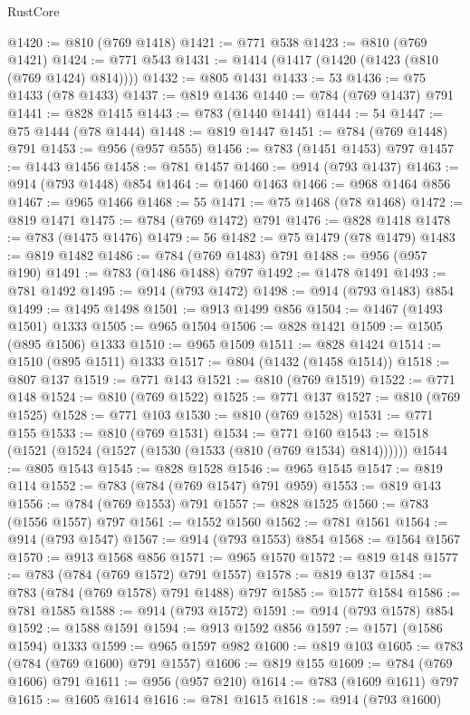 \begin{lexlean}{RustCore}
\begin{coremodule}
@1420 := @810 (@769 @1418)
@1421 := @771 @538
@1423 := @810 (@769 @1421)
@1424 := @771 @543
@1431 := @1414 (@1417 (@1420 (@1423 (@810 (@769 @1424) @814))))
@1432 := @805 @1431
@1433 := 53
@1436 := @75 @1433 (@78 @1433)
@1437 := @819 @1436
@1440 := @784 (@769 @1437) @791
@1441 := @828 @1415
@1443 := @783 (@1440 @1441)
@1444 := 54
@1447 := @75 @1444 (@78 @1444)
@1448 := @819 @1447
@1451 := @784 (@769 @1448) @791
@1453 := @956 (@957 @555)
@1456 := @783 (@1451 @1453) @797
@1457 := @1443 @1456
@1458 := @781 @1457
@1460 := @914 (@793 @1437)
@1463 := @914 (@793 @1448) @854
@1464 := @1460 @1463
@1466 := @968 @1464 @856
@1467 := @965 @1466
@1468 := 55
@1471 := @75 @1468 (@78 @1468)
@1472 := @819 @1471
@1475 := @784 (@769 @1472) @791
@1476 := @828 @1418
@1478 := @783 (@1475 @1476)
@1479 := 56
@1482 := @75 @1479 (@78 @1479)
@1483 := @819 @1482
@1486 := @784 (@769 @1483) @791
@1488 := @956 (@957 @190)
@1491 := @783 (@1486 @1488) @797
@1492 := @1478 @1491
@1493 := @781 @1492
@1495 := @914 (@793 @1472)
@1498 := @914 (@793 @1483) @854
@1499 := @1495 @1498
@1501 := @913 @1499 @856
@1504 := @1467 (@1493 @1501) @1333
@1505 := @965 @1504
@1506 := @828 @1421
@1509 := @1505 (@895 @1506) @1333
@1510 := @965 @1509
@1511 := @828 @1424
@1514 := @1510 (@895 @1511) @1333
@1517 := @804 (@1432 (@1458 @1514))
@1518 := @807 @137
@1519 := @771 @143
@1521 := @810 (@769 @1519)
@1522 := @771 @148
@1524 := @810 (@769 @1522)
@1525 := @771 @137
@1527 := @810 (@769 @1525)
@1528 := @771 @103
@1530 := @810 (@769 @1528)
@1531 := @771 @155
@1533 := @810 (@769 @1531)
@1534 := @771 @160
@1543 := @1518 (@1521 (@1524 (@1527 (@1530 (@1533 (@810 (@769 @1534) @814))))))
@1544 := @805 @1543
@1545 := @828 @1528
@1546 := @965 @1545
@1547 := @819 @114
@1552 := @783 (@784 (@769 @1547) @791 @959)
@1553 := @819 @143
@1556 := @784 (@769 @1553) @791
@1557 := @828 @1525
@1560 := @783 (@1556 @1557) @797
@1561 := @1552 @1560
@1562 := @781 @1561
@1564 := @914 (@793 @1547)
@1567 := @914 (@793 @1553) @854
@1568 := @1564 @1567
@1570 := @913 @1568 @856
@1571 := @965 @1570
@1572 := @819 @148
@1577 := @783 (@784 (@769 @1572) @791 @1557)
@1578 := @819 @137
@1584 := @783 (@784 (@769 @1578) @791 @1488) @797
@1585 := @1577 @1584
@1586 := @781 @1585
@1588 := @914 (@793 @1572)
@1591 := @914 (@793 @1578) @854
@1592 := @1588 @1591
@1594 := @913 @1592 @856
@1597 := @1571 (@1586 @1594) @1333
@1599 := @965 @1597 @982
@1600 := @819 @103
@1605 := @783 (@784 (@769 @1600) @791 @1557)
@1606 := @819 @155
@1609 := @784 (@769 @1606) @791
@1611 := @956 (@957 @210)
@1614 := @783 (@1609 @1611) @797
@1615 := @1605 @1614
@1616 := @781 @1615
@1618 := @914 (@793 @1600)

\end{coremodule}
\end{lexlean}
